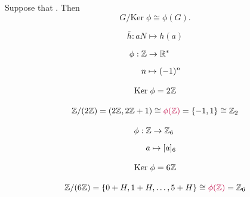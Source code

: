 \begin{frame}
  \begin{theorem}
    Suppose that . Then
    \[
      G/\text{Ker}\; \phi \cong \phi(G).
    \]
  \end{theorem}

  \pause
  \begin{center}
  \end{center}

  \pause

  \vspace{-0.80cm}
  \[
    \bar{h}: aN \mapsto h(a)
  \]

\end{frame}




\begin{frame}{}
  \begin{align*}
    \phi:\; & \mathbb{Z} \to \mathbb{R}^{\ast} \\[6pt]
            & n \mapsto (-1)^{n}
  \end{align*}

  \[
    \text{Ker}\; \phi = 2\mathbb{Z}
  \]

  \pause
  \[
    \mathbb{Z}/(2\mathbb{Z}) = (2\mathbb{Z}, 2\mathbb{Z} + 1) \cong \textcolor{purple}{\phi(\mathbb{Z})} = \{-1, 1\} \cong \mathbb{Z}_{2}
  \]
\end{frame}

\begin{frame}{}
  \begin{align*}
    \phi:\; & \mathbb{Z} \to \mathbb{Z}_{6} \\[6pt]
            & a \mapsto [a]_{6}
  \end{align*}

  \[
    \text{Ker}\; \phi = 6\mathbb{Z}
  \]

  \pause
  \[
    \mathbb{Z}/(6\mathbb{Z}) = \{0 + H, 1 + H, \dots, 5 + H\} \cong \textcolor{purple}{\phi(\mathbb{Z})} = \mathbb{Z}_{6}
  \]
\end{frame}

